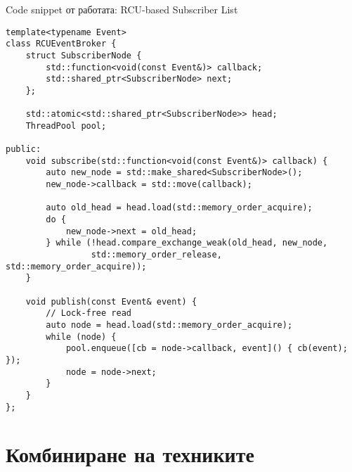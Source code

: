 \documentclass[aspectratio=169]{beamer}
\begin{document}
\begin{frame}[fragile]{Code snippet от работата: RCU-based Subscriber List}
\begin{lstlisting}[basicstyle=\ttfamily\tiny]
template<typename Event>
class RCUEventBroker {
    struct SubscriberNode {
        std::function<void(const Event&)> callback;
        std::shared_ptr<SubscriberNode> next;
    };
    
    std::atomic<std::shared_ptr<SubscriberNode>> head;
    ThreadPool pool;

public:
    void subscribe(std::function<void(const Event&)> callback) {
        auto new_node = std::make_shared<SubscriberNode>();
        new_node->callback = std::move(callback);
        
        auto old_head = head.load(std::memory_order_acquire);
        do {
            new_node->next = old_head;
        } while (!head.compare_exchange_weak(old_head, new_node,
                 std::memory_order_release, std::memory_order_acquire));
    }
    
    void publish(const Event& event) {
        // Lock-free read
        auto node = head.load(std::memory_order_acquire);
        while (node) {
            pool.enqueue([cb = node->callback, event]() { cb(event); });
            node = node->next;
        }
    }
};
\end{lstlisting}
\end{frame}

\section{Комбиниране на техниките}
\end{document}
